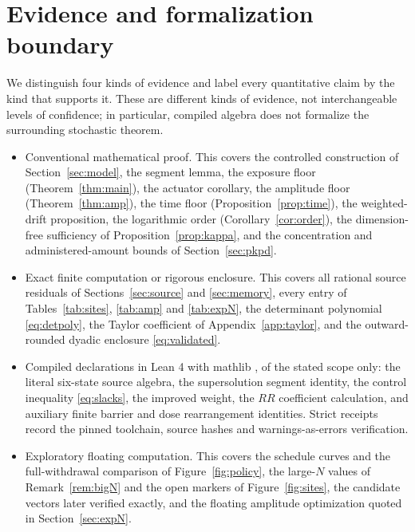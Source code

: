 \section{Evidence and formalization boundary}
\label{app:boundary}

We distinguish four kinds of evidence and label every quantitative claim by the
kind that supports it. These are different kinds of evidence, not
interchangeable levels of confidence; in particular, compiled algebra does not
formalize the surrounding stochastic theorem.

\begin{itemize}
\item[\textbf{C}] Conventional mathematical proof. This covers the controlled
construction of Section~\ref{sec:model}, the segment lemma, the exposure floor
(Theorem~\ref{thm:main}), the actuator corollary, the amplitude floor
(Theorem~\ref{thm:amp}), the time floor (Proposition~\ref{prop:time}), the
weighted-drift proposition, the logarithmic order (Corollary~\ref{cor:order}),
the dimension-free sufficiency of Proposition~\ref{prop:kappa}, and the
concentration and administered-amount bounds of Section~\ref{sec:pkpd}.
\item[\textbf{E}] Exact finite computation or rigorous enclosure. This covers
all rational source residuals of Sections~\ref{sec:source} and
\ref{sec:memory}, every entry of Tables~\ref{tab:sites}, \ref{tab:amp} and
\ref{tab:expN}, the determinant polynomial \eqref{eq:detpoly}, the Taylor
coefficient of Appendix~\ref{app:taylor}, and the outward-rounded dyadic
enclosure \eqref{eq:validated}.
\item[\textbf{K}] Compiled declarations in Lean 4 with mathlib
\citep{moura2021,mathlib2020}, of the stated scope only: the literal six-state
source algebra, the supersolution segment identity, the control inequality
\eqref{eq:slacks}, the improved weight, the $RR$ coefficient calculation, and
auxiliary finite barrier and dose rearrangement identities. Strict receipts
record the pinned toolchain, source hashes and warnings-as-errors verification.
\item[\textbf{N}] Exploratory floating computation. This covers the schedule
curves and the full-withdrawal comparison of Figure~\ref{fig:policy}, the
large-$N$ values of Remark~\ref{rem:bigN} and the open markers of
Figure~\ref{fig:sites}, the candidate vectors later verified exactly, and the
floating amplitude optimization quoted in Section~\ref{sec:expN}.
\end{itemize}

